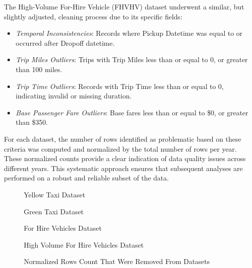 \documentclass[conference]{IEEEtran}
\begin{document}
The High-Volume For-Hire Vehicle (FHVHV) dataset underwent a similar, but slightly adjusted, cleaning process due to its
specific fields:
\begin{itemize}
  \item \emph{Temporal Inconsistencies}: Records where Pickup Datetime was equal to or occurred after Dropoff datetime.
  \item \emph{Trip Miles Outliers}: Trips with Trip Miles less than or equal to 0, or greater than 100 miles.
  \item \emph{Trip Time Outliers}: Records with Trip Time less than or equal to 0, indicating invalid or missing duration.
  \item \emph{Base Passenger Fare Outliers}: Base fares less than or equal to \$0, or greater than \$350.
\end{itemize}

For each dataset, the number of rows identified as problematic based on these criteria was computed and normalized by
the total number of rows per year. These normalized counts provide a clear indication of data quality issues across
different years. This systematic approach ensures that subsequent analyses are performed on a robust and reliable subset
of the data.

\begin{figure}[htbp]
  \centering
  \begin{minipage}[b]{0.45\linewidth}
    
    \caption{Yellow Taxi Dataset}
  \end{minipage}
  \hfill
  \begin{minipage}[b]{0.45\linewidth}
    
    \caption{Green Taxi Dataset}
  \end{minipage}

  \vspace{1em}

  \begin{minipage}[b]{0.45\linewidth}
    
    \caption{For Hire Vehicles Dataset}
  \end{minipage}
  \hfill
  \begin{minipage}[b]{0.45\linewidth}
    
    \caption{High Volume For Hire Vehicles Dataset}
  \end{minipage}

  \caption{Normalized Rows Count That Were Removed From Datasets}

\end{figure}
\end{document}
